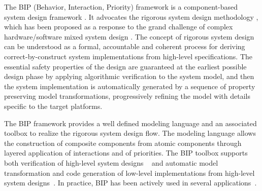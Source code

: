 The BIP (Behavior, Interaction, Priority) framework is a component-based system design framework \cite{bip11}.
 It advocates the rigorous system design methodology \cite{sifakis13}, 
 which has been proposed as a response to the grand challenge of complex hardware/software mixed system design \cite{sifakis2015}.
 The concept of rigorous system design can be understood as a formal, accountable and coherent process 
 for deriving correct-by-construct system implementations from high-level specifications.
 The essential safety properties of the design are guaranteed at the earliest possible design phase by applying algorithmic verification to the system model,
 and then the system implementation is automatically generated by a sequence of property preserving model transformations,
 progressively refining the model with details specific to the target platforms.

The BIP framework provides a well defined modeling language and an associated toolbox to realize the rigorous system design flow.
 The modeling language allows the construction of composite components from atomic components through layered application of interactions and of priorities.
 The BIP toolbox supports both verification of high-level system designs ~\cite{dfinder10,atva15,tgc15}
 and automatic model transformation and code generation of low-level implementations from high-level system designs~\cite{bip-emsoft10}.
 In practice, BIP has been actively used in several applications~\cite{bipapplication12a,bipapplication18}.
 
 




